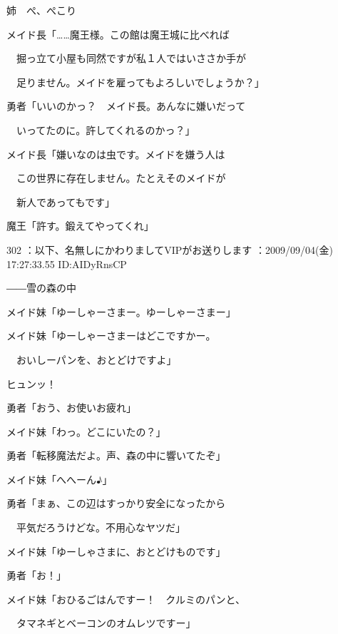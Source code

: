 \documentclass[a4j,twocolumn]{tarticle}
\begin{document}
姉　ぺ、ぺこり 



メイド長「……魔王様。この館は魔王城に比べれば\par{} 
　掘っ立て小屋も同然ですが私１人ではいささか手が\par{} 
　足りません。メイドを雇ってもよろしいでしょうか？」 



勇者「いいのかっ？　メイド長。あんなに嫌いだって\par{} 
　いってたのに。許してくれるのかっ？」 



メイド長「嫌いなのは虫です。メイドを嫌う人は\par{} 
　この世界に存在しません。たとえそのメイドが\par{} 
　新人であってもです」 



魔王「許す。鍛えてやってくれ」 

	
    
    

302 ：以下、名無しにかわりましてVIPがお送りします ：2009/09/04(金) 17:27:33.55 ID:AIDyRnsCP 


――雪の森の中 



メイド妹「ゆーしゃーさまー。ゆーしゃーさまー」 



メイド妹「ゆーしゃーさまーはどこですかー。\par{} 
　おいしーパンを、おとどけですよ」 



ヒュンッ！ 



勇者「おう、お使いお疲れ」 \par{}
メイド妹「わっ。どこにいたの？」 



勇者「転移魔法だよ。声、森の中に響いてたぞ」\par{} 
メイド妹「へへーん♪」 



勇者「まぁ、この辺はすっかり安全になったから\par{} 
　平気だろうけどな。不用心なヤツだ」\par{} 
メイド妹「ゆーしゃさまに、おとどけものです」\par{} 
勇者「お！」 



メイド妹「おひるごはんですー！　クルミのパンと、\par{} 
　タマネギとベーコンのオムレツですー」 
\end{document}
